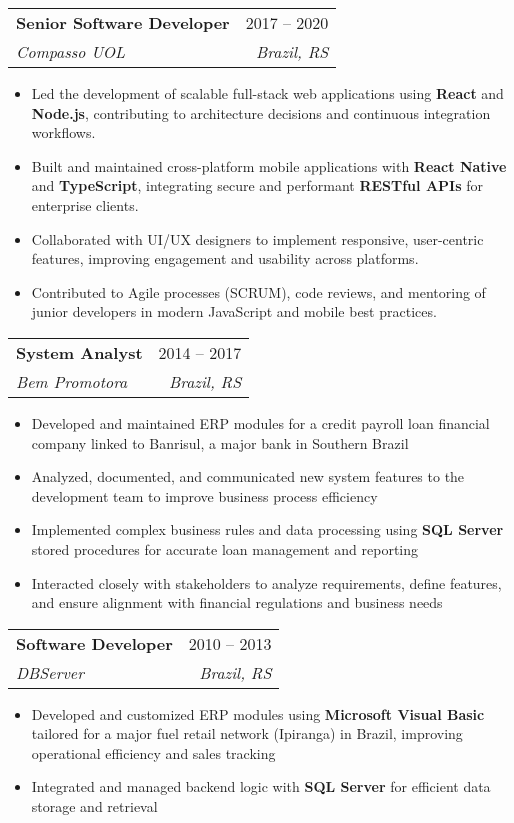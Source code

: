 \documentclass[letterpaper,11pt]{article}
\makeatletter
\newcommand{\resumeItem}[1]{
  \item\small{
    {#1 }%
  }
}
\newcommand{\resumeSubheading}[4]{
  \vspace{-2pt}\item
    \begin{tabular*}{0.97\textwidth}[t]{l@{\extracolsep{\fill}}r}
      \textbf{#1} & #2 \\
      \textit{\small#3} & \textit{\small #4} \\
    \end{tabular*}\vspace{-7pt}
}
\newcommand{\resumeSubSubheading}[2]{
    \item
    \begin{tabular*}{0.97\textwidth}{l@{\extracolsep{\fill}}r}
      \textit{\small#1} & \textit{\small #2} \\
    \end{tabular*}\vspace{-7pt}
}
\newcommand{\resumeSubHeadingListEnd}{\end{itemize}}
\newcommand{\resumeItemListStart}{\begin{itemize}}
\newcommand{\resumeItemListEnd}{\end{itemize}\vspace{-5pt}}
\makeatother
\begin{document}

    \resumeSubheading
      {Senior Software Developer}{2017 -- 2020}
      {Compasso UOL}{Brazil, RS}
      \resumeItemListStart
        \resumeItem{Led the development of scalable full-stack web applications using \textbf{React} and \textbf{Node.js}, contributing to architecture decisions and continuous integration workflows.}
        \resumeItem{Built and maintained cross-platform mobile applications with \textbf{React Native} and \textbf{TypeScript}, integrating secure and performant \textbf{RESTful APIs} for enterprise clients.}
        \resumeItem{Collaborated with UI/UX designers to implement responsive, user-centric features, improving engagement and usability across platforms.}
        \resumeItem{Contributed to Agile processes (SCRUM), code reviews, and mentoring of junior developers in modern JavaScript and mobile best practices.}
    
     \resumeItemListEnd

    \resumeSubheading
      {System Analyst}{2014 -- 2017}
      {Bem Promotora}{Brazil, RS}
      \resumeItemListStart
      \resumeItem{Developed and maintained ERP modules for a credit payroll loan financial company linked to Banrisul, a major bank in Southern Brazil}
      \resumeItem{Analyzed, documented, and communicated new system features to the development team to improve business process efficiency}
      \resumeItem{Implemented complex business rules and data processing using \textbf{SQL Server} stored procedures for accurate loan management and reporting}
      \resumeItem{Interacted closely with stakeholders to analyze requirements, define features, and ensure alignment with financial regulations and business needs}
        \resumeItemListEnd
     

    \resumeSubheading
      {Software Developer}{2010 -- 2013}
      {DBServer}{Brazil, RS}
      \resumeItemListStart
      \resumeItem{Developed and customized ERP modules using \textbf{Microsoft Visual Basic} tailored for a major fuel retail network (Ipiranga) in Brazil, improving operational efficiency and sales tracking}
      \resumeItem{Integrated and managed backend logic with \textbf{SQL Server} for efficient data storage and retrieval}
     \resumeItemListEnd
\end{document}
